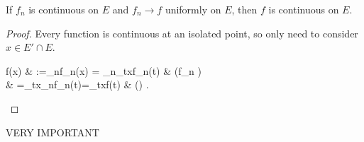 \begin{Corollary}
	\label{cor:7.12}
	If $f_{n}$ is continuous on $E$ and $f_{n}\to f$ uniformly on $E$, then $f$ is continuous on $E$.
	\begin{proof}
		Every function is continuous at an isolated point, so only need to consider $x \in E' \cap E$.\\
		\begin{flalign*}
			f(x) & :=\lim_{n\to \infty}{f_{n}(x)}  = \lim_{n\to \infty}{\lim_{t\to x}{f_{n}(t)}} & (\because f_{n} )      \\
			     & =\lim_{t\to x}{\lim_{n\to \infty}{f_{n}(t)}}=\lim_{t\to x}{f(t)}              & (\because {})
			.\end{flalign*}
	\end{proof}

	\begin{remark}
		VERY IMPORTANT
	\end{remark}
\end{Corollary}

